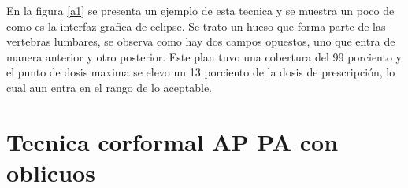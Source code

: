 \documentclass{article}
\begin{document}
\vspace{10pt}

En la figura \ref{a1} se presenta un ejemplo de esta tecnica y se muestra un poco de como es la interfaz grafica de eclipse. Se trato un hueso que forma parte de las vertebras lumbares, se observa como hay dos campos opuestos, uno que entra de manera anterior y otro posterior. Este plan tuvo una cobertura del 99 porciento y el punto de dosis maxima se elevo un 13 porciento de la dosis de prescripción, lo cual aun entra en el rango de lo aceptable.

\section{Tecnica corformal AP PA con oblicuos}
\end{document}

